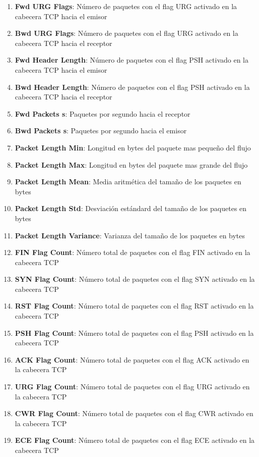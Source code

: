 \begin{enumerate}
    \item \textbf{Fwd URG Flags}: Número de paquetes con el flag URG activado en la cabecera TCP hacia el emisor
    \item \textbf{Bwd URG Flags}: Número de paquetes con el flag URG activado en la cabecera TCP hacia el receptor
    \item \textbf{Fwd Header Length}: Número de paquetes con el flag PSH activado en la cabecera TCP hacia el emisor
    \item \textbf{Bwd Header Length}: Número de paquetes con el flag PSH activado en la cabecera TCP hacia el receptor
    \item \textbf{Fwd Packets s}: Paquetes por segundo hacia el receptor
    \item \textbf{Bwd Packets s}: Paquetes por segundo hacia el emisor
    \item \textbf{Packet Length Min}: Longitud en bytes del paquete mas pequeño del flujo
    \item \textbf{Packet Length Max}: Longitud en bytes del paquete mas grande del flujo
    \item \textbf{Packet Length Mean}: Media aritmética del tamaño de los paquetes en bytes
    \item \textbf{Packet Length Std}: Desviación estándard del tamaño de los paquetes en bytes
    \item \textbf{Packet Length Variance}: Varianza del tamaño de los paquetes en bytes
    \item \textbf{FIN Flag Count}: Número total de paquetes con el flag FIN activado en la cabecera TCP
    \item \textbf{SYN Flag Count}: Número total de paquetes con el flag SYN activado en la cabecera TCP
    \item \textbf{RST Flag Count}: Número total de paquetes con el flag RST activado en la cabecera TCP
    \item \textbf{PSH Flag Count}: Número total de paquetes con el flag PSH activado en la cabecera TCP
    \item \textbf{ACK Flag Count}: Número total de paquetes con el flag ACK activado en la cabecera TCP
    \item \textbf{URG Flag Count}: Número total de paquetes con el flag URG activado en la cabecera TCP
    \item \textbf{CWR Flag Count}: Número total de paquetes con el flag CWR activado en la cabecera TCP
    \item \textbf{ECE Flag Count}: Número total de paquetes con el flag ECE activado en la cabecera TCP

\end{enumerate}
